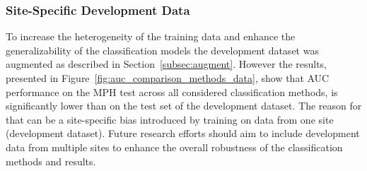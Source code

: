 \subsubsection{Site-Specific Development Data}

To increase the heterogeneity of the training data and enhance the generalizability 
of the classification models the development dataset was augmented as described in Section~\ref{subsec:augment}.
However the results, presented in Figure~\ref{fig:auc_comparison_methods_data}, 
show that AUC performance on the MPH test across all considered classification methods, 
is significantly lower than on the test set of the development dataset.
The reason for that can be a site-specific bias introduced by training on data from one site (development dataset).
Future research efforts should aim to include development data from multiple sites 
to enhance the overall robustness of the classification methods and results.










